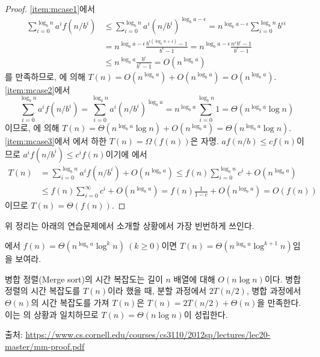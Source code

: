 \begin{proof}
    \ref{item:mcase1}에서
    \begin{align*}
        \sum_{i=0}^{\log_b n}a^i f(n/b^i) 
        &\leq \sum_{i=0}^{\log_b n}a^i (n/b^i)^{\log_b a-\epsilon} 
        = n^{\log_b a-\epsilon}\sum_{i=0}^{\log_b n}b^{\epsilon i} \\
        &= n^{\log_b a-\epsilon} \frac{b^{\epsilon(\log_b n+1)}-1}{b^\epsilon-1}
        =n^{\log_b a-\epsilon}\frac{n^\epsilon b^\epsilon-1}{b^\epsilon-1} \\
        &\leq n^{\log_b a}\frac{b^\epsilon}{b^\epsilon-1}=O(n^{\log_b a})
    \end{align*}
    를 만족하므로, 에 의해 $T(n)=O(n^{\log_b a})+O(n^{\log_b a})=O(n^{\log_b a})$. \\
    \ref{item:mcase2}에서
    \begin{equation*}
        \sum_{i=0}^{\log_b n}a^i f(n/b^i)
        =\sum_{i=0}^{\log_b n}a^i (n/b^i)^{\log_b a}
        =n^{\log_b a}\sum_{i=0}^{\log_b n} 1
        =\Theta(n^{\log_b a}\log n)
    \end{equation*}
    이므로, 에 의해 $T(n)=\Theta(n^{\log_b a}\log n)+O(n^{\log_b a})=\Theta(n^{\log_b a} \log n)$. \\
    \ref{item:mcase3}에서 에서 하한 $T(n)=\Omega(f(n))$은 자명. $af(n/b)\leq cf(n)$이므로 $a^i f(n/b^i) \leq c^i f(n)$이기에 에서
    \begin{align*}
        T(n) &=\sum_{i=0}^{\log_b n}a^i f(n/b^i) +O(n^{\log_b a})
        \leq f(n)\sum_{i=0}^{\log_b n}c^i + O(n^{\log_b a}) \\
        &\leq f(n)\sum_{i=0}^{\infty}c^i +O(n^{\log_b a})
        =f(n)\frac{1}{1-c}+O(n^{\log_b a})=O(f(n))
    \end{align*}
    이므로 $T(n)=\Theta(f(n))$.
\end{proof}
위 정리는 아래의 연습문제에서 소개할 상황에서 가장 빈번하게 쓰인다.
\begin{exercise}\label{exer:master}
    에서 $f(n)=\Theta(n^{\log_b a}\log^k n) \ (k\geq 0)$이면 $T(n)=\Theta(n^{\log_b a}\log^{k+1} n)$임을 보여라.
\end{exercise}
\begin{example}
    병합 정렬(Merge sort)의 시간 복잡도는 길이 $n$ 배열에 대해 $O(n\log n)$이다. 병합 정렬의 시간 복잡도를 $T(n)$이라 했을 때, 분할 과정에서 $2T(n/2)$, 병합 과정에서 $\Theta(n)$의 시간 복잡도를 가져 $T(n)$은 $T(n)=2T(n/2)+\Theta(n)$을 만족한다. 이는 의 상황과 일치하므로 $T(n)=\Theta(n\log n)$이 성립한다.
\end{example}
출처: \url{https://www.cs.cornell.edu/courses/cs3110/2012sp/lectures/lec20-master/mm-proof.pdf}
